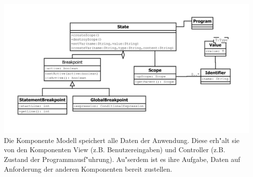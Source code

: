 \documentclass[10pt,a4paper,titlepage]{article}
\begin{document}
\includegraphics[scale=0.8]{images/Modell.pdf} \\
Die Komponente Modell speichert alle Daten der Anwendung. Diese erh"alt sie von den Komponenten View (z.B. Benutzereingaben) und Controller (z.B. Zustand der Programmausf"uhrung). Au"serdem ist es ihre Aufgabe, Daten auf Anforderung der anderen Komponenten bereit zustellen. 
\end{document}
